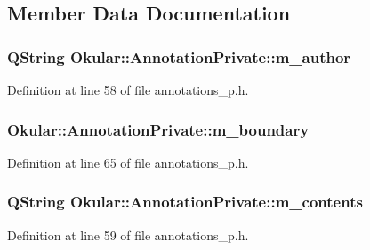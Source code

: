 \subsection{Member Data Documentation}
\hypertarget{classOkular_1_1AnnotationPrivate_af2997724c734cbd4dfbc6536e280d536}{
\subsubsection[{m\+\_\+author}]{\setlength{\rightskip}{0pt plus 5cm}Q\+String Okular\+::\+Annotation\+Private\+::m\+\_\+author}}\label{classOkular_1_1AnnotationPrivate_af2997724c734cbd4dfbc6536e280d536}


Definition at line 58 of file annotations\+\_\+p.\+h.

\hypertarget{classOkular_1_1AnnotationPrivate_a58948ebd679895ca16c5f9f917f23323}{
\subsubsection[{m\+\_\+boundary}]{ Okular\+::\+Annotation\+Private\+::m\+\_\+boundary}}\label{classOkular_1_1AnnotationPrivate_a58948ebd679895ca16c5f9f917f23323}


Definition at line 65 of file annotations\+\_\+p.\+h.

\hypertarget{classOkular_1_1AnnotationPrivate_ab2b69e4809035828d98a4ec701565149}{
\subsubsection[{m\+\_\+contents}]{\setlength{\rightskip}{0pt plus 5cm}Q\+String Okular\+::\+Annotation\+Private\+::m\+\_\+contents}}\label{classOkular_1_1AnnotationPrivate_ab2b69e4809035828d98a4ec701565149}


Definition at line 59 of file annotations\+\_\+p.\+h.

